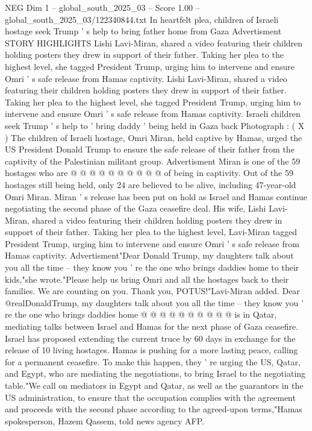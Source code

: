 \begin{textsample}{NEG Dim 1 – global\_south\_2025\_03 – Score 1.00 – global\_south\_2025\_03/122340844.txt}  \label{ex:f1_neg_188}
In heartfelt plea, children of Israeli hostage seek Trump ' s help to bring father home from Gaza Advertisment STORY HIGHLIGHTS Lishi Lavi-Miran, shared a video featuring their children holding posters they drew in support of their father.
Taking her plea to the highest level, she tagged President Trump, urging him to intervene and ensure Omri ' s safe release from Hamas captivity.
Lishi Lavi-Miran, shared a video featuring their children holding posters they drew in support of their father.
Taking her plea to the highest level, she tagged President Trump, urging him to intervene and ensure Omri ' s safe release from Hamas captivity.
Israeli children seek Trump ' s help to ' bring daddy ' being held in Gaza back Photograph : ( X ) The children of Israeli hostage, Omri Miran, held captive by Hamas, urged the US President Donald Trump to ensure the safe release of their father from the captivity of the Palestinian militant group.
Advertisment Miran is one of the 59 hostages who are @ @ @ @ @ @ @ @ @ @ of being in captivity.
Out of the 59 hostages still being held, only 24 are believed to be alive, including 47-year-old Omri Miran.
Miran ' s release has been put on hold as Israel and Hamas continue negotiating the second phase of the Gaza ceasefire deal.
His wife, Lishi Lavi-Miran, shared a video featuring their children holding posters they drew in support of their father.
Taking her plea to the highest level, Lavi-Miran tagged President Trump, urging him to intervene and ensure Omri ' s safe release from Hamas captivity.
Advertisment"Dear Donald Trump, my daughters talk about you all the time -- they know you ' re the one who brings daddies home to their kids,"she wrote."Please help us bring Omri and all the hostages back to their families.
We are counting on you.
Thank you, POTUS!"Lavi-Miran added.
Dear @realDonaldTrump, my daughters talk about you all the time -- they know you ' re the one who brings daddies home @ @ @ @ @ @ @ @ @ @ is in Qatar, mediating talks between Israel and Hamas for the next phase of Gaza ceasefire.
Israel has proposed extending the current truce by 60 days in exchange for the release of 10 living hostages.
Hamas is pushing for a more lasting peace, calling for a permanent ceasefire.
To make this happen, they ' re urging the US, Qatar, and Egypt, who are mediating the negotiations, to bring Israel to the negotiating table."We call on mediators in Egypt and Qatar, as well as the guarantors in the US administration, to ensure that the occupation complies with the agreement and proceeds with the second phase according to the agreed-upon terms,"Hamas spokesperson, Hazem Qassem, told news agency AFP.

\end{textsample}
